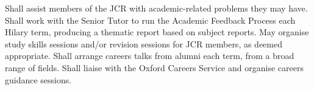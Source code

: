 Shall assist members of the JCR with academic-related problems they may have. 
Shall work with the Senior Tutor to run the Academic Feedback Process each Hilary term, producing a thematic report based on subject reports.
May organise study skills sessions and/or revision sessions for JCR members, as deemed appropriate.
Shall arrange careers talks from alumni each term, from a broad range of fields.
Shall liaise with the Oxford Careers Service and organise careers guidance sessions.
